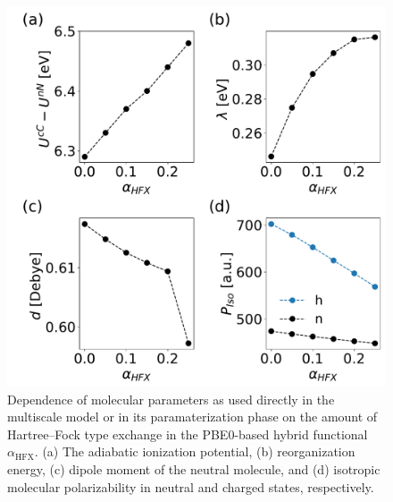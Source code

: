 \documentclass[%
 reprint,
superscriptaddress,
 amsmath,amssymb,
 aps,
prb,
floatfix
]{revtex4-2}
\begin{document}
\begin{figure}[tbp]
    \centering
    \includegraphics[width=\linewidth]{figs/fig_autogen.pdf}
    \caption{Dependence of molecular parameters as used directly in the multiscale model or in its paramaterization phase on the amount of Hartree--Fock type exchange in the PBE0-based hybrid functional $\alpha_\text{HFX}$. (a) The adiabatic ionization potential, (b) reorganization energy, (c) dipole moment of the neutral molecule, and (d) isotropic molecular polarizability in neutral and charged states, respectively.}
    \label{fig:autogen_MADN}
\end{figure}
\end{document}
